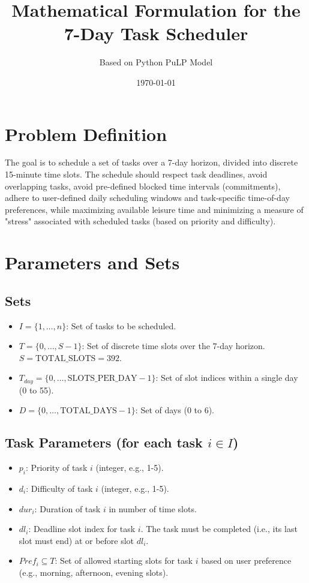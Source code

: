 \documentclass{article}
\title{Mathematical Formulation for the 7-Day Task Scheduler}
\author{Based on Python PuLP Model}
\date{\today}
\begin{document}
\maketitle

\section{Problem Definition}
The goal is to schedule a set of tasks over a 7-day horizon, divided into discrete 15-minute time slots. The schedule should respect task deadlines, avoid overlapping tasks, avoid pre-defined blocked time intervals (commitments), adhere to user-defined daily scheduling windows and task-specific time-of-day preferences, while maximizing available leisure time and minimizing a measure of "stress" associated with scheduled tasks (based on priority and difficulty).

\section{Parameters and Sets}

\subsection{Sets}
\begin{itemize}
    \item $I = \{1, \dots, n\}$: Set of tasks to be scheduled.
    \item $T = \{0, \dots, S-1\}$: Set of discrete time slots over the 7-day horizon. $S = \text{TOTAL\_SLOTS} = 392$.
    \item $T_{day} = \{0, \dots, \text{SLOTS\_PER\_DAY}-1\}$: Set of slot indices within a single day (0 to 55).
    \item $D = \{0, \dots, \text{TOTAL\_DAYS}-1\}$: Set of days (0 to 6).
\end{itemize}

\subsection{Task Parameters (for each task $i \in I$)}
\begin{itemize}
    \item $p_i$: Priority of task $i$ (integer, e.g., 1-5).
    \item $d_i$: Difficulty of task $i$ (integer, e.g., 1-5).
    \item $dur_i$: Duration of task $i$ in number of time slots.
    \item $dl_i$: Deadline slot index for task $i$. The task must be completed (i.e., its last slot must end) at or before slot $dl_i$.
    \item $Pref_i \subseteq T$: Set of allowed starting slots for task $i$ based on user preference (e.g., morning, afternoon, evening slots).
\end{itemize}
\end{document}
